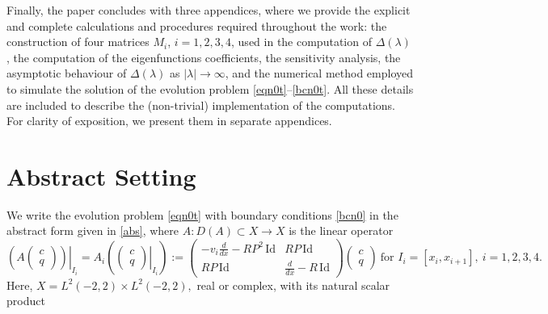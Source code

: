 \documentclass[a4paper]{article}
\def\Id{\rm{Id}}
\def\Id{\mathrm{Id}}
\numberwithin{equation}{section}
\begin{document}
Finally, the paper concludes with three appendices, where we provide the explicit and complete calculations and procedures required throughout the work: the construction of four matrices $M_i$, $i=1,2,3,4$, used in the computation of $\Delta(\lambda)$, the computation of the eigenfunctions coefficients, the sensitivity analysis, the asymptotic behaviour of $\Delta(\lambda)$ as $|\lambda|\to\infty$, and the numerical method employed to simulate the solution of the evolution problem \eqref{eqn0t}--\eqref{bcn0t}. All these details are included to describe the (non-trivial) implementation of the computations. For clarity of exposition, we present them in separate appendices.

\section{Abstract Setting}\label{sec:functional}
We write the evolution problem \eqref{eqn0t} with boundary conditions \eqref{bcn0} in the abstract form given in \eqref{abs},
where $A:D(A)\subset X\rightarrow X$ is the linear operator
\begin{equation} \label{opA}
\left.\left(A\begin{pmatrix}c\\q\end{pmatrix}\right)\right|_{I_i}=A_i \left(\left.\begin{pmatrix}c\\q\end{pmatrix}\right|_{I_i}\right):=\begin{pmatrix}
-v_i\frac{d}{dx}-R P^2 \,\Id& RP\, \Id\\RP\, \Id&\frac{d}{dx}-R\, \Id
\end{pmatrix}\begin{pmatrix}c\\q\end{pmatrix}\ \textrm{for }  I_i=[x_i,x_{i+1}],\ i = 1,2,3,4.
\end{equation}
Here, $X=L^2(-2,2)\times L^2(-2,2),$
real or complex,
with its natural scalar product
\end{document}
